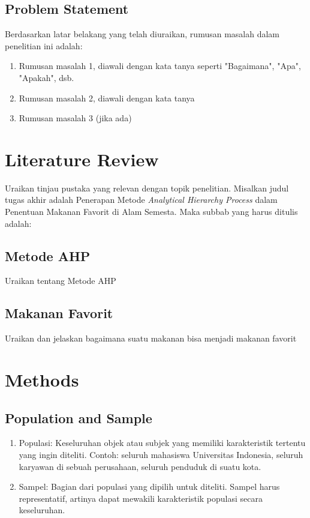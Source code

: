 \documentclass[english,12pt,a4paper]{book}
\begin{document}
\section{Problem Statement}
Berdasarkan latar belakang yang telah diuraikan, rumusan masalah dalam penelitian ini adalah:
\begin{enumerate}
	\item Rumusan masalah 1, diawali dengan kata tanya seperti "Bagaimana", "Apa", "Apakah", dsb.
	\item Rumusan masalah 2, diawali dengan kata tanya
	\item Rumusan masalah 3 (jika ada)
\end{enumerate}

\chapter{Literature Review}
Uraikan tinjau pustaka yang relevan dengan topik penelitian. Misalkan judul tugas akhir adalah Penerapan Metode \textit{Analytical Hierarchy Process} dalam Penentuan Makanan Favorit di Alam Semesta. Maka subbab yang harus ditulis adalah:
\section{Metode AHP}
Uraikan tentang Metode AHP
\section{Makanan Favorit}
Uraikan dan jelaskan bagaimana suatu makanan bisa menjadi makanan favorit

\chapter{Methods} 
\section{Population and Sample}
\begin{enumerate}
	\item Populasi: Keseluruhan objek atau subjek yang memiliki karakteristik tertentu yang ingin diteliti. Contoh: seluruh mahasiswa Universitas Indonesia, seluruh karyawan di sebuah perusahaan, seluruh penduduk di suatu kota.
	\item Sampel: Bagian dari populasi yang dipilih untuk diteliti. Sampel harus representatif, artinya dapat mewakili karakteristik populasi secara keseluruhan.
\end{enumerate}
\end{document}
